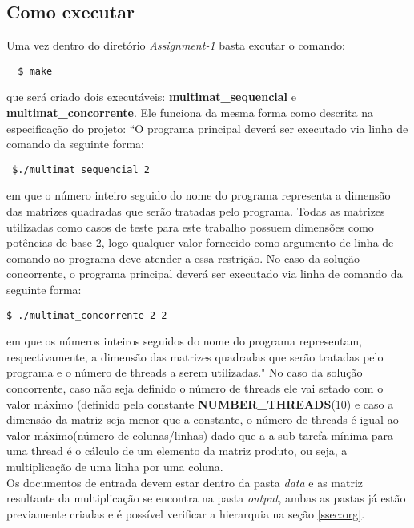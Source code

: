 \subsection{Como executar}
Uma vez dentro do diretório \textit{Assignment-1} basta excutar o comando:
\begin{verbatim}
  $ make
\end{verbatim}
que será criado dois executáveis:
\textbf{multimat\_sequencial} e \textbf{multimat\_concorrente}.
Ele funciona da mesma forma como descrita na especificação do projeto:
``O programa principal deverá ser executado via linha de comando da seguinte forma:
\begin{verbatim}
 $./multimat_sequencial 2
\end{verbatim}
em que o número inteiro seguido do nome do programa representa a dimensão das matrizes quadradas que serão tratadas pelo programa. Todas as matrizes utilizadas como casos de teste para este trabalho possuem dimensões como potências de base 2, logo qualquer valor fornecido como argumento de linha de comando ao programa deve atender a essa restrição. No caso da solução concorrente, o programa principal deverá ser executado via linha de comando da seguinte forma:
\begin{verbatim}
$ ./multimat_concorrente 2 2
\end{verbatim}
em que os números inteiros seguidos do nome do programa representam, respectivamente, a dimensão
das matrizes quadradas que serão tratadas pelo programa e o número de threads a serem
utilizadas." No caso da solução concorrente, caso não seja definido o número de threads ele vai setado com o valor máximo (definido pela constante \textbf{NUMBER\_THREADS}(10) e caso a dimensão da matriz seja menor que a constante, o número de threads é igual ao valor máximo(número de colunas/linhas) dado que a a sub-tarefa mínima para uma thread é o cálculo de um elemento da matriz produto, ou seja, a multiplicação de uma linha por uma coluna.\\
Os documentos de entrada devem estar dentro da pasta \textit{data} e as matriz resultante da multiplicação se encontra na pasta \textit{output}, ambas as pastas já estão previamente criadas e é possível verificar a hierarquia na seção \ref{ssec:org}.\\
